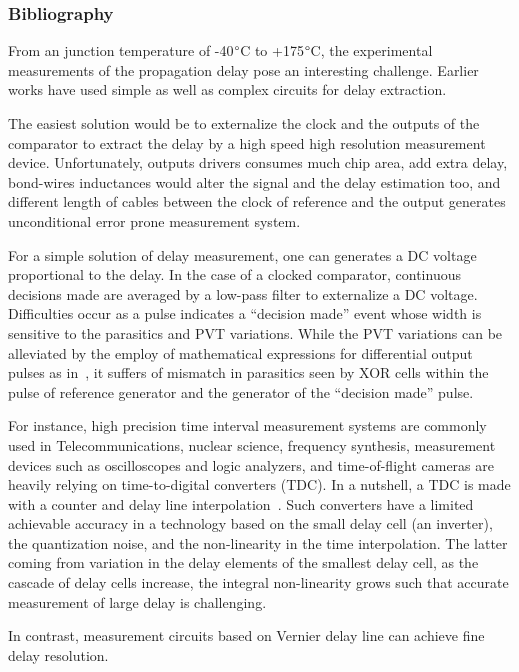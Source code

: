 \subsubsection{Bibliography}
From an junction temperature of -40\(\degree \)C to +175\(\degree \)C, the experimental measurements of the propagation delay pose an interesting challenge. Earlier works have used simple as well as complex circuits for delay extraction. 

The easiest solution would be to externalize the clock and the outputs of the comparator to extract the delay by a high speed high resolution measurement device. Unfortunately, outputs drivers consumes much chip area, add extra delay, bond-wires inductances would alter the signal and the delay estimation too, and different length of cables between the clock of reference and the output generates unconditional error prone measurement system.

For a simple solution of delay measurement, one can generates a DC voltage proportional to the delay. In the case of a clocked comparator, continuous decisions made are averaged by a low-pass filter to externalize a DC voltage. Difficulties occur as a pulse indicates a ``decision made'' event whose width is sensitive to the parasitics and PVT variations. While the PVT variations can be alleviated by the employ of mathematical expressions for differential output pulses as in~\cite{1706643}, it suffers of mismatch in parasitics seen by XOR cells within the pulse of reference generator and the generator of the ``decision made'' pulse.

For instance, high precision time interval measurement systems are commonly used in Telecommunications, nuclear science, frequency synthesis, measurement devices such as oscilloscopes and logic analyzers, and time-of-flight cameras are heavily relying on time-to-digital converters (TDC). In a nutshell, a TDC is made with a counter and delay line interpolation~\cite{1637593}. Such converters have a limited achievable accuracy in a technology based on the small delay cell (an inverter), the quantization noise, and the non-linearity in the time interpolation. The latter coming from variation in the delay elements of the smallest delay cell, as the cascade of delay cells increase, the integral non-linearity grows such that accurate measurement of large delay is challenging.

In contrast, measurement circuits based on Vernier delay line can achieve fine delay resolution.

